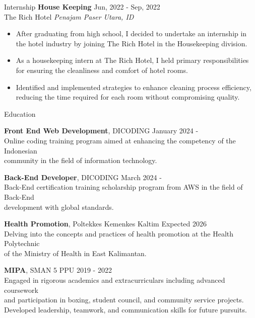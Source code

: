 \documentclass{resume} %
\begin{document}

\begin{rSection}{Internship} 
\textbf{House Keeping} \hfill Jun, 2022 - Sep, 2022\\
The Rich Hotel \hfill \textit{Penajam Paser Utara, ID}
 \begin{itemize}
    \itemsep -3pt {} 
     \item After graduating from high school, I decided to undertake an internship in the hotel industry by joining The Rich Hotel in the Housekeeping division.
     \item As a housekeeping intern at The Rich Hotel, I held primary responsibilities for ensuring the cleanliness and comfort of hotel rooms.
    \item Identified and implemented strategies to enhance cleaning process efficiency, reducing the time required for each room without compromising quality.
 \end{itemize}


\end{rSection}


\begin{rSection}{Education}

{\bf Front End Web Development}, DICODING \hfill {January 2024 -}\\
Online coding training program aimed at enhancing the competency of the Indonesian\\ community in the field of information technology.

{\bf Back-End Developer}, DICODING \hfill {March 2024 -}\\
Back-End certification training scholarship program from AWS in the field of Back-End\\ development with global standards.

{\bf Health Promotion}, Poltekkes Kemenkes Kaltim \hfill {Expected 2026}\\
Delving into the concepts and practices of health promotion at the Health Polytechnic\\ of the Ministry of Health in East Kalimantan.

{\bf MIPA}, SMAN 5 PPU \hfill {2019 - 2022}\\
 Engaged in rigorous academics and extracurriculars including advanced coursework\\ and participation in boxing, student council, and community service projects.\\ Developed leadership, teamwork, and communication skills for future pursuits.

\end{rSection}
\end{document}
